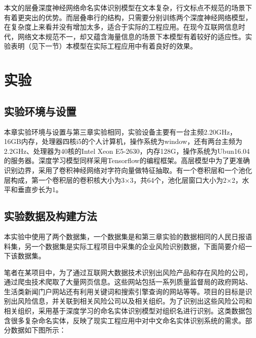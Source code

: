 \documentclass[winfonts,master,oneside,nobackinfo]{njuthesis}
\begin{document}
本文的层叠深度神经网络命名实体识别模型在文本复杂，行文标点不规范的场景下有着更突出的优势。而层叠串行的结构，只需要分别训练两个深度神经网络模型，在复杂度上来看并没有增加太多，适合于实际的工程应用。在现今互联网信息时代，网络文本规范不一，却又蕴含海量信息的场景下本模型有着较好的适应性。实验表明（见下一节）本模型在实际工程应用中有着良好的效果。

\section{实验}

\subsection{实验环境与设置}

本章实验环境与设置与第三章实验相同，实验设备主要有一台主频2.20GHz，16GB内存，处理器四核i5的个人计算机，操作系统为window，还有两台主频为2.2GHz、处理器为40核的Intel Xeon E5-2630，内存128G，操作系统为Ubun16.04的服务器。深度学习模型同样采用Tensorflow的编程框架。高层模型中为了更准确识别边界，采用了卷积神经网络对字符向量做特征抽取。有一个卷积层和一个池化层构成，第一个卷积层的卷积核大小为3×3，共64个，池化层窗口大小为2×2，水平和垂直步长为1。

\subsection{实验数据及构建方法}

本实验中使用了两个数据集，一个数据集是和第三章实验的数据相同的人民日报语料集，另一个数据集是实际工程项目中采集的企业风险识别数据，下面简要介绍一下该数据集。

笔者在某项目中，为了通过互联网大数据技术识别出风险产品和存在风险的公司，通过爬虫技术爬取了大量网页信息。这些网站包括一系列质量监督局的政府网站、生活类新闻门户网站还有利用关键词和搜索引擎查询的网站等等。项目的目标是识别出风险信息，并关联到相关风险公司以及相关组织。为了识别出这些风险公司和相关组织，采用基于深度学习的命名实体识别模型对组织名进行识别。这类数据包含很多复杂命名实体，反映了现实工程应用中对中文命名实体识别系统的需求。部分数据如下图所示：
\end{document}
